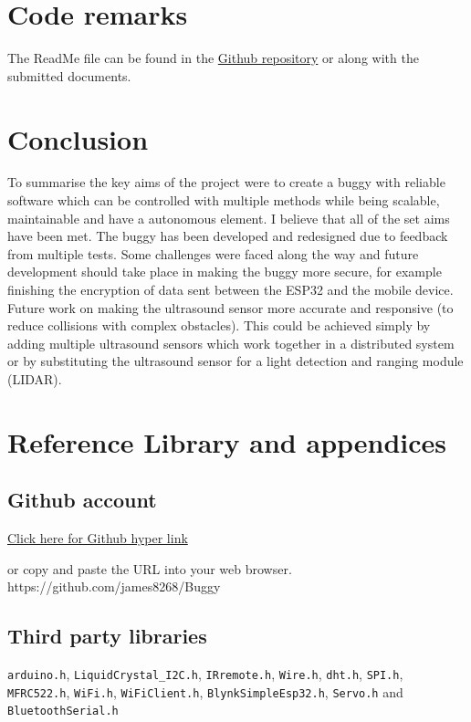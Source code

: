 \documentclass[8pt, a4paper]{article}
\begin{document}
	

\section{Code remarks}

The ReadMe file can be found in the \href{https://github.com/james8268/Buggy}{Github repository} or along with the submitted documents. 
 


\section{Conclusion}
To summarise the key aims of the project were to create a buggy with reliable software which can be controlled with multiple methods while being scalable, maintainable and have a autonomous element. I believe that all of the set aims have been met. The buggy has been developed and redesigned due to feedback from multiple tests. Some challenges were faced along the way and future development should take place in making the buggy more secure, for example finishing the encryption of data sent between the ESP32 and the mobile device. Future work on making the ultrasound sensor more accurate and responsive (to reduce collisions with complex obstacles). This could be achieved simply by adding multiple ultrasound sensors which work together in a distributed system or by substituting the ultrasound sensor for a light detection and ranging module (LIDAR). 


\newpage
\section{Reference Library and appendices}
\subsection{Github account}

\href{https://github.com/james8268/Buggy}{Click here for Github hyper link} 

or copy and paste the URL into your web browser. https://github.com/james8268/Buggy

\listoffigures

\subsection{Third party libraries}

\verb|arduino.h|, \verb|LiquidCrystal_I2C.h|, \verb|IRremote.h|, \verb|Wire.h|, \verb|dht.h|, \verb|SPI.h|, \verb|MFRC522.h|, \verb|WiFi.h|, \verb|WiFiClient.h|, \verb|BlynkSimpleEsp32.h|, \verb|Servo.h| and \verb|BluetoothSerial.h|
\end{document}
